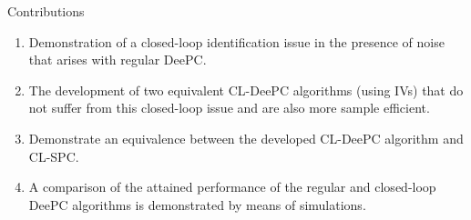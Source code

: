 Contributions
\begin{enumerate}
\item Demonstration of a closed-loop identification issue in the presence of noise that arises with regular \ac{DeePC}.
\item The development of two equivalent \ac{CL-DeePC} algorithms (using \ac{IVs}) that do not suffer from this closed-loop issue and are also more sample efficient.
\item Demonstrate an equivalence between the developed \ac{CL-DeePC} algorithm and \ac{CL-SPC}.
\item A comparison of the attained performance of the regular and closed-loop \ac{DeePC} algorithms is demonstrated by means of simulations.
\end{enumerate}